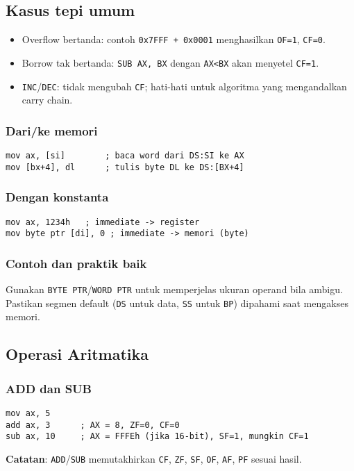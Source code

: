 \subsection{Kasus tepi umum}
\begin{itemize}
  \item Overflow bertanda: contoh \texttt{0x7FFF + 0x0001} menghasilkan \texttt{OF=1}, \texttt{CF=0}.
  \item Borrow tak bertanda: \texttt{SUB AX, BX} dengan \texttt{AX<BX} akan menyetel \texttt{CF=1}.
  \item \texttt{INC}/\texttt{DEC}: tidak mengubah \texttt{CF}; hati-hati untuk algoritma yang mengandalkan carry chain.
\end{itemize}

\subsubsection{Dari/ke memori}
\begin{verbatim}
mov ax, [si]        ; baca word dari DS:SI ke AX
mov [bx+4], dl      ; tulis byte DL ke DS:[BX+4]
\end{verbatim}

\subsubsection{Dengan konstanta}
\begin{verbatim}
mov ax, 1234h   ; immediate -> register
mov byte ptr [di], 0 ; immediate -> memori (byte)
\end{verbatim}

\subsubsection{Contoh dan praktik baik}
Gunakan \texttt{BYTE PTR}/\texttt{WORD PTR} untuk memperjelas ukuran operand bila ambigu. Pastikan segmen default (\texttt{DS} untuk data, \texttt{SS} untuk \texttt{BP}) dipahami saat mengakses memori.

\subsection{Operasi Aritmatika}
\subsubsection{ADD dan SUB}
\begin{verbatim}
mov ax, 5
add ax, 3      ; AX = 8, ZF=0, CF=0
sub ax, 10     ; AX = FFFEh (jika 16-bit), SF=1, mungkin CF=1
\end{verbatim}
\textbf{Catatan}: \texttt{ADD}/\texttt{SUB} memutakhirkan \texttt{CF}, \texttt{ZF}, \texttt{SF}, \texttt{OF}, \texttt{AF}, \texttt{PF} sesuai hasil.

